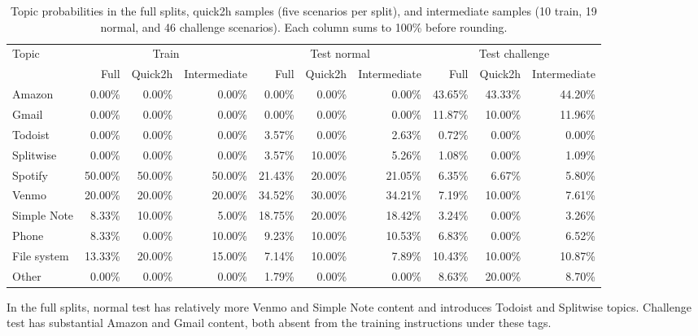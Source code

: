 \documentclass[11pt]{article}
\begin{document}
\begin{table}[htbp]
\centering
\small
\setlength{\tabcolsep}{4pt}
\caption{Topic probabilities in the full splits, quick2h samples (five
scenarios per split), and intermediate samples (10 train, 19 normal, and 46
challenge scenarios). Each column sums to 100\% before rounding.}
\label{tab:topic-probabilities}
\begin{tabular}{lrrr@{\hspace{10pt}}rrr@{\hspace{10pt}}rrr}
\toprule
Topic & \multicolumn{3}{c}{Train} & \multicolumn{3}{c}{Test normal}
      & \multicolumn{3}{c}{Test challenge} \\
\cmidrule(lr){2-4}\cmidrule(lr){5-7}\cmidrule(lr){8-10}
 & Full & Quick2h & Intermediate & Full & Quick2h & Intermediate
 & Full & Quick2h & Intermediate \\
\midrule
Amazon      & 0.00\%  & 0.00\%  & 0.00\%  & 0.00\%  & 0.00\%  & 0.00\%  & 43.65\% & 43.33\% & 44.20\% \\
Gmail       & 0.00\%  & 0.00\%  & 0.00\%  & 0.00\%  & 0.00\%  & 0.00\%  & 11.87\% & 10.00\% & 11.96\% \\
Todoist     & 0.00\%  & 0.00\%  & 0.00\%  & 3.57\%  & 0.00\%  & 2.63\%  & 0.72\%  & 0.00\%  & 0.00\% \\
Splitwise   & 0.00\%  & 0.00\%  & 0.00\%  & 3.57\%  & 10.00\% & 5.26\%  & 1.08\%  & 0.00\%  & 1.09\% \\
Spotify     & 50.00\% & 50.00\% & 50.00\% & 21.43\% & 20.00\% & 21.05\% & 6.35\%  & 6.67\%  & 5.80\% \\
Venmo       & 20.00\% & 20.00\% & 20.00\% & 34.52\% & 30.00\% & 34.21\% & 7.19\%  & 10.00\% & 7.61\% \\
Simple Note & 8.33\%  & 10.00\% & 5.00\%  & 18.75\% & 20.00\% & 18.42\% & 3.24\%  & 0.00\%  & 3.26\% \\
Phone       & 8.33\%  & 0.00\%  & 10.00\% & 9.23\%  & 10.00\% & 10.53\% & 6.83\%  & 0.00\%  & 6.52\% \\
File system & 13.33\% & 20.00\% & 15.00\% & 7.14\%  & 10.00\% & 7.89\%  & 10.43\% & 10.00\% & 10.87\% \\
Other       & 0.00\%  & 0.00\%  & 0.00\%  & 1.79\%  & 0.00\%  & 0.00\%  & 8.63\%  & 20.00\% & 8.70\% \\
\bottomrule
\end{tabular}
\end{table}

In the full splits, normal test has relatively more Venmo and Simple Note
content and introduces Todoist and Splitwise topics. Challenge test has
substantial Amazon and Gmail content, both absent from the training
instructions under these tags.
\end{document}
